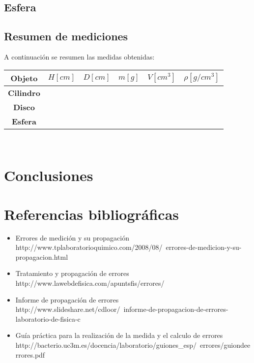 \documentclass[letter,twoside,11pt]{article}
\begin{document}
\subsection{Esfera}
\vspace{6.0cm}

\subsection{Resumen de mediciones}
A continuación se resumen las medidas obtenidas:

\begin{center}
\begin{tabular}{|c|>{\centering}m{2.2cm}<{\centering}
                  |>{\centering}m{2.2cm}<{\centering}
                  |>{\centering}m{2.2cm}<{\centering}
                  |>{\centering}m{2.2cm}<{\centering}
                  |>{\centering}m{2.2cm}<{\centering}|}
\hline
\textbf{Objeto} & \textbf{$H[cm]$}
             & \textbf{$D[cm]$}
             & \textbf{$m[g]$}
             & \textbf{$V[cm^3]$}
             & \textbf{$\rho[g/cm^3]$} \tabularnewline \hline
\textbf{Cilindro} & & & & & \\ \hline
\textbf{Disco} & & & & & \\ \hline
\textbf{Esfera} & & & & & \\ \hline
\end{tabular}\\
\end{center}

\section{Conclusiones}

\section{Referencias bibliográficas}
\begin{itemize}
\item Errores de medición y su propagación \\
http://www.tplaboratorioquimico.com/2008/08/\
errores-de-medicion-y-su-propagacion.html
\item Tratamiento y propagación de errores \\
http://www.lawebdefisica.com/apuntsfis/errores/
\item Informe de propagación de errores \\
http://www.slideshare.net/cdloor/\
informe-de-propagacion-de-errores-laboratorio-de-fisica-c
\item Guía práctica para la realización de la medida y el calculo de errores \\
http://bacterio.uc3m.es/docencia/laboratorio/guiones\_esp/\
errores/guiondeerrores.pdf
\end{itemize}
\end{document}
